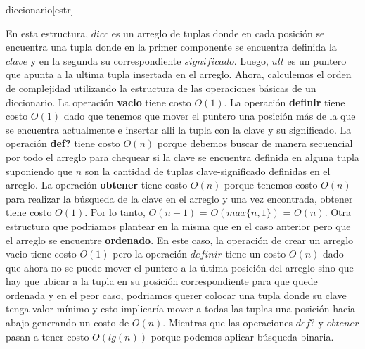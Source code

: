 \documentclass[10pt,a4paper]{article}
\begin{document}
\begin{Estructura}{diccionario}[estr]
	\begin{Tupla}[estr]%
	\end{Tupla}
\end{Estructura}
\medskip
En esta estructura, $dicc$ es un arreglo de tuplas donde en cada posición se encuentra una tupla donde en la primer componente se encuentra definida la $clave$ y en la segunda su correspondiente $significado$. Luego, $ult$ es un puntero que apunta a la ultima tupla insertada en el arreglo.
\newline
\newline
Ahora, calculemos el orden de complejidad utilizando la estructura de las operaciones básicas de un diccionario.
\newline
\newline
La operación \textbf{vacio} tiene costo $O(1)$.
\newline
\newline
La operación \textbf{definir} tiene costo $O(1)$ dado que tenemos que mover el puntero una posición más de la que se encuentra actualmente e insertar alli la tupla con la clave y su significado.
\newline
\newline
La operación \textbf{def?} tiene costo $O(n)$ porque debemos buscar de manera secuencial por todo el arreglo para chequear si la clave se encuentra definida en alguna tupla suponiendo que $n$ son la cantidad de tuplas clave-significado definidas en el arreglo.
\newline
\newline
La operación \textbf{obtener} tiene costo $O(n)$ porque tenemos costo $O(n)$ para realizar la búsqueda de la clave en el arreglo y una vez encontrada, obtener tiene costo $O(1)$. Por lo tanto, $O(n + 1)$ = $O(max\{n,1\})$ = $O(n)$.
\newline
\newline
Otra estructura que podriamos plantear en la misma que en el caso anterior pero que el arreglo se encuentre \textbf{ordenado}.
\newline
\newline
En este caso, la operación de crear un arreglo vacio tiene costo $O(1)$ pero la operación $definir$ tiene un costo $O(n)$ dado que ahora no se puede mover el puntero a la última posición del arreglo sino que hay que ubicar a la tupla en su posición correspondiente para que quede ordenada y en el peor caso, podriamos querer colocar una tupla donde su clave tenga valor mínimo y esto implicaría mover a todas las tuplas una posición hacia abajo generando un costo de $O(n)$. Mientras que las operaciones $def?$ y $obtener$ pasan a tener costo $O(lg(n))$ porque podemos aplicar búsqueda binaria.
\end{document}
